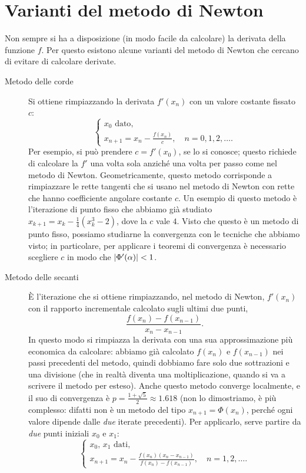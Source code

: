 \documentclass[a4paper]{report}
\DeclarePairedDelimiter{\abs}{\lvert}{\rvert}
\theoremstyle{definiton}
\theoremstyle{remark}
\begin{document}
\section{Varianti del metodo di Newton} Non sempre si ha a disposizione (in modo facile da calcolare) la derivata della funzione $f$. Per questo esistono alcune varianti del metodo di Newton che cercano di evitare di calcolare derivate.
\begin{description}
    \item[Metodo delle corde] Si ottiene rimpiazzando la derivata $f'(x_n)$ con un valore costante fissato $c$:
        \[
            \begin{cases}
                \text{$x_0$ dato},\\
                x_{n+1} = x_n - \frac{f(x_n)}{c}, \quad n=0,1,2,\dots.
            \end{cases}
        \]    
    Per esempio, si può prendere $c = f'(x_0)$, se lo si conosce; questo richiede di calcolare la $f'$ una volta sola anziché una volta per passo come nel metodo di Newton. Geometricamente, questo metodo corrisponde a rimpiazzare le rette tangenti che si usano nel metodo di Newton con rette che hanno coefficiente angolare costante $c$. Un esempio di questo metodo è l'iterazione di punto fisso che abbiamo già studiato $x_{k+1} = x_{k} - \frac14 (x_k^3-2)$, dove la $c$ vale $4$. Visto che questo è un metodo di punto fisso, possiamo studiarne la convergenza con le tecniche che abbiamo visto; in particolare, per applicare i teoremi di convergenza è necessario scegliere $c$ in modo che $\abs{\Phi'(\alpha)} < 1$.
    \item[Metodo delle secanti] È l'iterazione che si ottiene rimpiazzando, nel metodo di Newton, $f'(x_n)$ con il rapporto incrementale calcolato sugli ultimi due punti,
    \[
    \frac{f(x_n) - f(x_{n-1})}{x_n - x_{n-1}}.
    \]
    In questo modo si rimpiazza la derivata con una sua approssimazione più economica da calcolare: abbiamo già calcolato $f(x_n)$ e $f(x_{n-1})$ nei passi precedenti del metodo, quindi dobbiamo fare solo due sottrazioni e una divisione (che in realtà diventa una moltiplicazione, quando si va a scrivere il metodo per esteso). Anche questo metodo converge localmente, e il suo di convergenza è $p = \frac{1+\sqrt{5}}{2} \approx 1.618$ (non lo dimostriamo, è più complesso: difatti non è un metodo del tipo $x_{n+1} = \Phi(x_n)$, perché ogni valore dipende dalle \emph{due} iterate precedenti). Per applicarlo, serve partire da \emph{due} punti iniziali $x_0$ e $x_1$:
    \[
    \begin{cases}
        \text{$x_0$, $x_1$ dati},\\
        x_{n+1} = x_n - \frac{f(x_n) (x_n - x_{n-1})}{f(x_n) - f(x_{n-1})}, \quad n=1,2,\dots.
    \end{cases}
    \]
\end{description}
\end{document}
